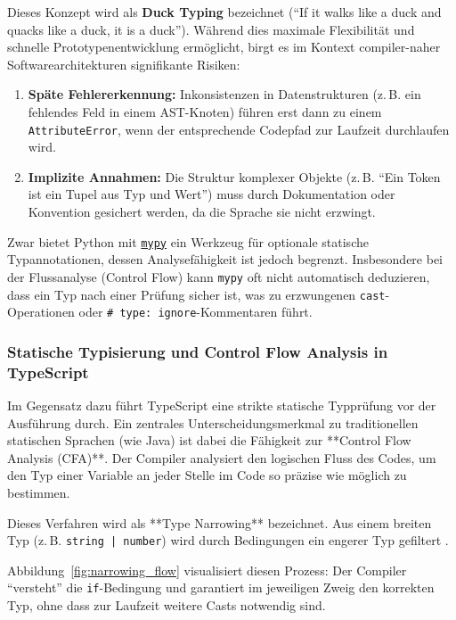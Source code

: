 Dieses Konzept wird als \textbf{Duck Typing} bezeichnet (\enquote{If it walks like a duck and quacks like a duck, it is a duck}).
Während dies maximale Flexibilität und schnelle Prototypenentwicklung ermöglicht, birgt es im Kontext compiler-naher Softwarearchitekturen signifikante Risiken:
\begin{enumerate}
	\item \textbf{Späte Fehlererkennung:} Inkonsistenzen in Datenstrukturen (z.\,B. ein fehlendes Feld in einem AST-Knoten) führen erst dann zu einem \texttt{AttributeError}, wenn der entsprechende Codepfad zur Laufzeit durchlaufen wird.
	\item \textbf{Implizite Annahmen:} Die Struktur komplexer Objekte (z.\,B. \enquote{Ein Token ist ein Tupel aus Typ und Wert}) muss durch Dokumentation oder Konvention gesichert werden, da die Sprache sie nicht erzwingt.
\end{enumerate}

Zwar bietet Python mit \href{http://mypy-lang.org/}{\texttt{mypy}} ein Werkzeug für optionale statische Typannotationen, dessen Analysefähigkeit ist jedoch begrenzt. Insbesondere bei der Flussanalyse (Control Flow) kann \texttt{mypy} oft nicht automatisch deduzieren, dass ein Typ nach einer Prüfung sicher ist, was zu erzwungenen \texttt{cast}-Operationen oder \texttt{\# type: ignore}-Kommentaren führt.

\subsubsection{Statische Typisierung und Control Flow Analysis in TypeScript}
Im Gegensatz dazu führt TypeScript eine strikte statische Typprüfung vor der Ausführung durch. Ein zentrales Unterscheidungsmerkmal zu traditionellen statischen Sprachen (wie Java) ist dabei die Fähigkeit zur **Control Flow Analysis (CFA)**. Der Compiler analysiert den logischen Fluss des Codes, um den Typ einer Variable an jeder Stelle im Code so präzise wie möglich zu bestimmen.

Dieses Verfahren wird als **Type Narrowing** bezeichnet. Aus einem breiten Typ (z.\,B. \texttt{string | number}) wird durch Bedingungen ein engerer Typ gefiltert \autocite{typescript_handbook_narrowing}.

Abbildung~\ref{fig:narrowing_flow} visualisiert diesen Prozess: Der Compiler \enquote{versteht} die \texttt{if}-Beding\-ung und garantiert im jeweiligen Zweig den korrekten Typ, ohne dass zur Laufzeit weitere Casts notwendig sind.

